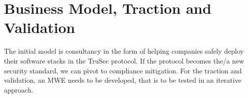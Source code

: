 \vspace{-0.16cm}
\section{Business Model, Traction and Validation}
\vspace{-0.15cm}
The initial model is consultancy in the form of helping companies safely deploy their software stacks in the TruSec protocol. If the protocol becomes the/a new security standard, we can pivot to compliance mitigation. For the traction and validation, an MWE needs to be developed, that is to be tested in an iterative approach.